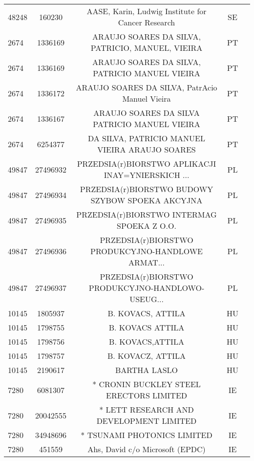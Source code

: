 \begin{longtable}{|l|c|c|c|c|}
     48248 &     160230 &  AASE, Karin, Ludwig Institute for Cancer Research &      SE \\
      2674 &    1336169 &   ARAUJO SOARES DA SILVA, PATRICIO, MANUEL, VIEIRA &      PT \\
      2674 &    1336169 &     ARAUJO SOARES DA SILVA, PATRICIO MANUEL VIEIRA &      PT \\
      2674 &    1336172 &     ARAUJO SOARES DA SILVA, PatrAcio Manuel Vieira &      PT \\
      2674 &    1336167 &      ARAUJO SOARES DA SILVA PATRICIO MANUEL VIEIRA &      PT \\
      2674 &    6254377 &     DA SILVA, PATRICIO MANUEL VIEIRA ARAUJO SOARES &      PT \\
     49847 &   27496932 &  PRZEDSIA(r)BIORSTWO APLIKACJI INAY=YNIERSKICH ... &      PL \\
     49847 &   27496934 &   PRZEDSIA(r)BIORSTWO BUDOWY SZYBOW SPOEKA AKCYJNA &      PL \\
     49847 &   27496935 &         PRZEDSIA(r)BIORSTWO INTERMAG SPOEKA Z O.O. &      PL \\
     49847 &   27496936 &  PRZEDSIA(r)BIORSTWO PRODUKCYJNO-HANDLOWE ARMAT... &      PL \\
     49847 &   27496937 &  PRZEDSIA(r)BIORSTWO PRODUKCYJNO-HANDLOWO-USEUG... &      PL \\
     10145 &    1805937 &                                  B. KOVACS, ATTILA &      HU \\
     10145 &    1798755 &                                   B. KOVACS ATTILA &      HU \\
     10145 &    1798756 &                                   B. KOVACS,ATTILA &      HU \\
     10145 &    1798757 &                                  B. KOVACZ, ATTILA &      HU \\
     10145 &    2190617 &                                       BARTHA LASLO &      HU \\
      7280 &    6081307 &            * CRONIN BUCKLEY STEEL ERECTORS LIMITED &      IE \\
      7280 &   20042555 &            * LETT RESEARCH AND DEVELOPMENT LIMITED &      IE \\
      7280 &   34948696 &                        * TSUNAMI PHOTONICS LIMITED &      IE \\
      7280 &     451559 &                  Ahs, David  c/o Microsoft  (EPDC) &      IE \\

\end{longtable}

